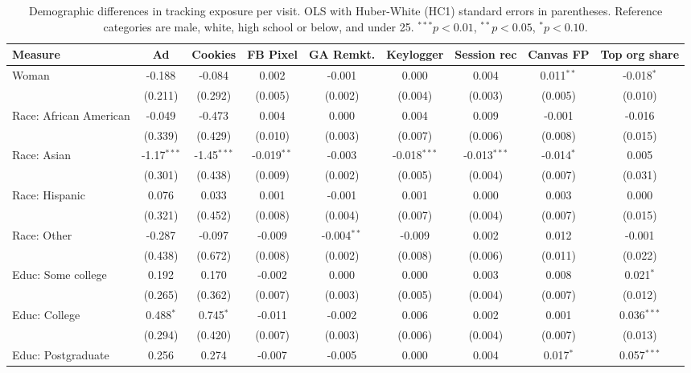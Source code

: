 \begin{table}[htbp]
\centering
\caption{Demographic differences in tracking exposure per visit. OLS with Huber-White (HC1) standard errors in parentheses. Reference categories are male, white, high school or below, and under 25. $^{***}p<0.01$, $^{**}p<0.05$, $^{*}p<0.10$.}
\label{tab:demo_differences_exposure_rate}
\begin{adjustbox}{max width=\textwidth}
\begin{tabular}{lcccccccc}
\toprule
Measure & Ad & Cookies & FB Pixel & GA Remkt. & Keylogger & Session rec & Canvas FP & Top org share \\
\midrule
Woman & -0.188 & -0.084 & 0.002 & -0.001 & 0.000 & 0.004 & 0.011$^{**}$ & -0.018$^{*}$ \\
 & (0.211) & (0.292) & (0.005) & (0.002) & (0.004) & (0.003) & (0.005) & (0.010) \\
Race: African American & -0.049 & -0.473 & 0.004 & 0.000 & 0.004 & 0.009 & -0.001 & -0.016 \\
 & (0.339) & (0.429) & (0.010) & (0.003) & (0.007) & (0.006) & (0.008) & (0.015) \\
Race: Asian & -1.17$^{***}$ & -1.45$^{***}$ & -0.019$^{**}$ & -0.003 & -0.018$^{***}$ & -0.013$^{***}$ & -0.014$^{*}$ & 0.005 \\
 & (0.301) & (0.438) & (0.009) & (0.002) & (0.005) & (0.004) & (0.007) & (0.031) \\
Race: Hispanic & 0.076 & 0.033 & 0.001 & -0.001 & 0.001 & 0.000 & 0.003 & 0.000 \\
 & (0.321) & (0.452) & (0.008) & (0.004) & (0.007) & (0.004) & (0.007) & (0.015) \\
Race: Other & -0.287 & -0.097 & -0.009 & -0.004$^{**}$ & -0.009 & 0.002 & 0.012 & -0.001 \\
 & (0.438) & (0.672) & (0.008) & (0.002) & (0.008) & (0.006) & (0.011) & (0.022) \\
Educ: Some college & 0.192 & 0.170 & -0.002 & 0.000 & 0.000 & 0.003 & 0.008 & 0.021$^{*}$ \\
 & (0.265) & (0.362) & (0.007) & (0.003) & (0.005) & (0.004) & (0.007) & (0.012) \\
Educ: College & 0.488$^{*}$ & 0.745$^{*}$ & -0.011 & -0.002 & 0.006 & 0.002 & 0.001 & 0.036$^{***}$ \\
 & (0.294) & (0.420) & (0.007) & (0.003) & (0.006) & (0.004) & (0.007) & (0.013) \\
Educ: Postgraduate & 0.256 & 0.274 & -0.007 & -0.005 & 0.000 & 0.004 & 0.017$^{*}$ & 0.057$^{***}$ \\

\end{tabular}
\end{adjustbox}
\end{table}
